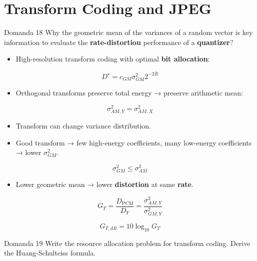 \section{Transform Coding and JPEG}




\begin{questionbox}{Domanda 18}
Why the geometric mean of the variances of a random vector is key information to evaluate the \textbf{\textbf{rate}-\textbf{distortion}} performance of a \textbf{quantizer}?
\end{questionbox}


\begin{itemize}
  \item High-resolution transform coding with optimal \textbf{bit allocation}:
\end{itemize}


$$
D^\star = c_{GM}\sigma_{GM}^2 2^{-2\bar{R}}
$$


\begin{itemize}
  \item Orthogonal transforms preserve total energy → preserve arithmetic mean:
\end{itemize}


$$
\sigma_{AM,Y}^2 = \sigma_{AM,X}^2
$$


\begin{itemize}
  \item Transform can change variance distribution.
  \item Good transform → few high-energy coefficients, many low-energy coefficients → lower $\sigma_{GM}^2$.
\end{itemize}


$$
\sigma_{GM}^2 \le \sigma_{AM}^2
$$


\begin{itemize}
  \item Lower geometric mean → lower \textbf{distortion} at same \textbf{rate}.
\end{itemize}


$$
G_T = \frac{D_{\text{PCM}}}{D_Y}
=\frac{\sigma_{AM,Y}^2}{\sigma_{GM,Y}^2}
$$



$$
G_{T,dB}=10\log_{10}G_T
$$




\begin{questionbox}{Domanda 19}
Write the resource allocation problem for transform coding. Derive the Huang-Schulteiss formula.
\end{questionbox}


